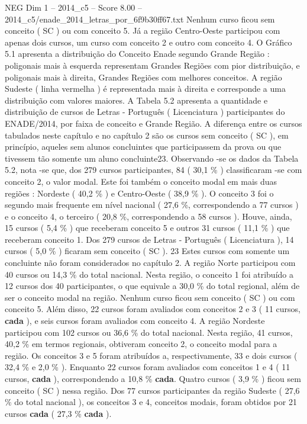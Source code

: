 \begin{textsample}{NEG Dim 1 – 2014\_c5 – Score 8.00 – 2014\_c5/enade\_2014\_letras\_por\_6f9b30ff67.txt}
Nenhum curso ficou sem conceito ( SC ) ou com conceito 5.
Já a região Centro-Oeste participou com apenas dois cursos, um curso com conceito 2 e outro com conceito 4.
O Gráfico 5.1 apresenta a distribuição do Conceito Enade segundo Grande Região : poligonais mais à esquerda representam Grandes Regiões com pior distribuição, e poligonais mais à direita, Grandes Regiões com melhores conceitos.
A região Sudeste ( linha vermelha ) é representada mais à direita e corresponde a uma distribuição com valores maiores.
A Tabela 5.2 apresenta a quantidade e distribuição de cursos de Letras - Português ( Licenciatura ) participantes do ENADE/2014, por faixa de conceito e Grande Região.
A diferença entre os cursos tabulados neste capítulo e no capítulo 2 são os cursos sem conceito ( SC ), em princípio, aqueles sem alunos concluintes que participassem da prova ou que tivessem tão somente um aluno concluinte23.
Observando -se os dados da Tabela 5.2, nota -se que, dos 279 cursos participantes, 84 ( 30,1 \% ) classificaram -se com conceito 2, o valor modal.
Este foi também o conceito modal em mais duas regiões : Nordeste ( 40,2 \% ) e Centro-Oeste ( 38,9 \% ).
O conceito 3 foi o segundo mais frequente em nível nacional ( 27,6 \%, correspondendo a 77 cursos ) e o conceito 4, o terceiro ( 20,8 \%, correspondendo a 58 cursos ).
Houve, ainda, 15 cursos ( 5,4 \% ) que receberam conceito 5 e outros 31 cursos ( 11,1 \% ) que receberam conceito 1.
Dos 279 cursos de Letras - Português ( Licenciatura ), 14 cursos ( 5,0 \% ) ficaram sem conceito ( SC ). 23 Estes cursos com somente um concluinte não foram considerados no capítulo 2.
A região Norte participou com 40 cursos ou 14,3 \% do total nacional.
Nesta região, o conceito 1 foi atribuído a 12 cursos dos 40 participantes, o que equivale a 30,0 \% do total regional, além de ser o conceito modal na região.
Nenhum curso ficou sem conceito ( SC ) ou com conceito 5.
Além disso, 22 cursos foram avaliados com conceitos 2 e 3 ( 11 cursos, \textbf{cada} ), e seis cursos foram avaliados com conceito 4.
A região Nordeste participou com 102 cursos ou 36,6 \% do total nacional.
Nesta região, 41 cursos, 40,2 \% em termos regionais, obtiveram conceito 2, o conceito modal para a região.
Os conceitos 3 e 5 foram atribuídos a, respectivamente, 33 e dois cursos ( 32,4 \% e 2,0 \% ).
Enquanto 22 cursos foram avaliados com conceitos 1 e 4 ( 11 cursos, \textbf{cada} ), correspondendo a 10,8 \% \textbf{cada}.
Quatro cursos ( 3,9 \% ) ficou sem conceito ( SC ) nessa região.
Dos 77 cursos participantes da região Sudeste ( 27,6 \% do total nacional ), os conceitos 3 e 4, conceitos modais, foram obtidos por 21 cursos \textbf{cada} ( 27,3 \% \textbf{cada} ).

\end{textsample}
